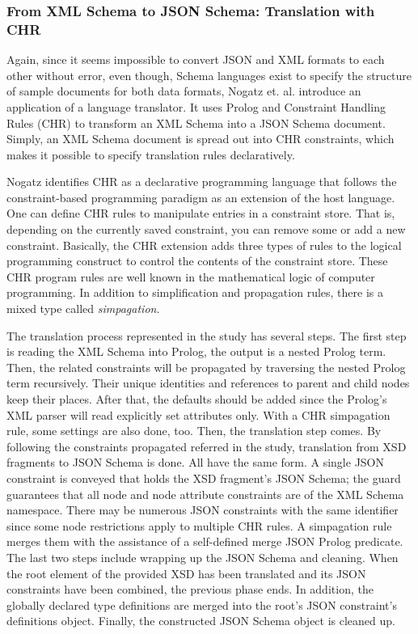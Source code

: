 \subsubsection{From XML Schema to JSON Schema: Translation with CHR}
Again, since it seems impossible to convert JSON and XML formats to each other
without error, even though, Schema languages exist to specify the structure of
sample documents for both data formats, Nogatz et. al. \autocite{Nogatz2014}
introduce an application of a language translator. It uses Prolog and Constraint
Handling Rules (CHR) to transform an XML Schema into a JSON Schema document.
Simply, an XML Schema document is spread out into CHR constraints, which makes
it possible to specify translation rules declaratively.

Nogatz identifies CHR as a declarative programming language that follows the
constraint-based programming paradigm as an extension of the host language. One
can define CHR rules to manipulate entries in a constraint store. That is,
depending on the currently saved constraint, you can remove some or add a new
constraint. Basically, the CHR extension adds three types of rules to the
logical programming construct to control the contents of the constraint store.
These CHR program rules are well known in the mathematical logic of computer
programming. In addition to simplification and propagation rules, there is a
mixed type called \emph{simpagation}. 

The translation process represented in the study has several steps. The first
step is reading the XML Schema into Prolog, the output is a nested Prolog term.
Then, the related constraints will be propagated by traversing the nested Prolog
term recursively. Their unique identities and references to parent and child
nodes keep their places. After that, the defaults should be added since the
Prolog’s XML parser will read explicitly set attributes only. With a CHR
simpagation rule, some settings are also done, too. Then, the translation step
comes. By following the constraints propagated referred in the study,
translation from XSD fragments to JSON Schema is done. All have the same form. A
single JSON constraint is conveyed that holds the XSD fragment's JSON Schema;
the guard guarantees that all node and node attribute constraints are of the XML
Schema namespace. There may be numerous JSON constraints with the same
identifier since some node restrictions apply to multiple CHR rules. A
simpagation rule merges them with the assistance of a self-defined merge JSON
Prolog predicate. The last two steps include wrapping up the JSON Schema and
cleaning. When the root element of the provided XSD has been translated and its
JSON constraints have been combined, the previous phase ends. In addition, the
globally declared type definitions are merged into the root's JSON constraint's
definitions object. Finally, the constructed JSON Schema object is cleaned up.


